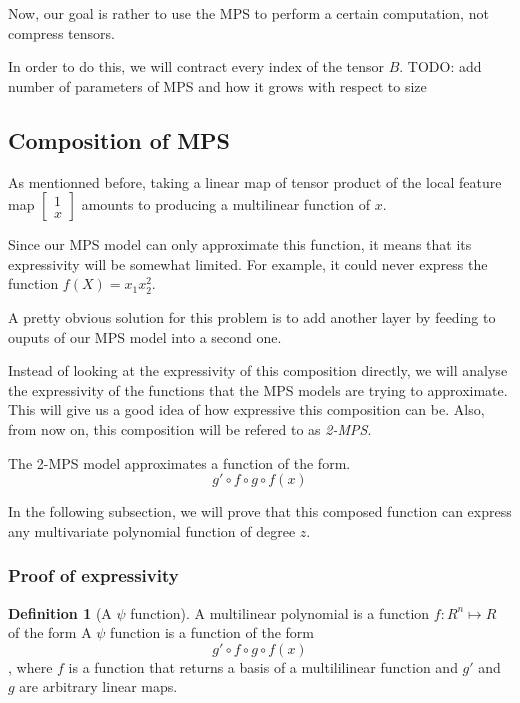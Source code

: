 \documentclass{article}
\theoremstyle{definition}
\newtheorem{definition}{Definition}[section]
\theoremstyle{definition}
\begin{document}
Now, our goal is rather to use the MPS to perform a certain computation, not compress tensors. 

In order to do this, we will contract every index of the tensor $B$.
TODO: add number of parameters of MPS and how it grows with respect to size

\subsection{Composition of MPS}
As mentionned before, taking a linear map of  tensor product of the local feature map 
$ \begin{bmatrix} 1 \\ x \end{bmatrix} $ amounts to producing a multilinear function of $x$.

Since our MPS model can only approximate this function, it means that its expressivity
will be somewhat limited. For example, it could never express the function $f(X) = x_1x_2^2$.

A pretty obvious solution for this problem is to add another layer by feeding to ouputs of 
our MPS model into a second one.

Instead of looking at the expressivity of this composition directly, we will analyse 
the expressivity of the functions that the MPS models are trying to approximate. This 
will give us a good idea of how expressive this composition can be. Also, from now on,
this composition will be refered to as \emph{2-MPS}.

The 2-MPS model approximates a function of the form.
\[  
    g' \circ f \circ g \circ f (x)
\]

In the following subsection, we will prove that this composed function can express
any multivariate polynomial function of degree $z$.

\subsubsection{Proof of expressivity}

\begin{definition}[A $\psi$ function]
    A multilinear polynomial is a function $f: R^n \mapsto R$ of the form
    A $\psi$ function is a function of the form
    \[  g' \circ f \circ g \circ f (x) \],
    where $f$ is a function that returns a basis of a multililinear function and 
    $g'$ and $g$ are arbitrary linear maps.
\end{definition}
\end{document}
